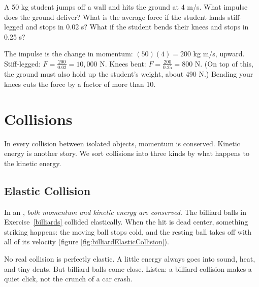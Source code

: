 \begin{Exercise}[title={Landing a jump}, label=impulse_jump]
A 50 kg student jumps off a wall and hits the ground at 4 m/s. What impulse
does the ground deliver? What is the average force if the student lands
stiff-legged and stops in 0.02 s? What if the student bends their knees and
stops in 0.25 s?
\end{Exercise}
\begin{Answer}[ref=impulse_jump]
The impulse is the change in momentum: $(50)(4) = 200$ kg m/s, upward.
Stiff-legged: $F = \frac{200}{0.02} = 10{,}000$ N. Knees bent:
$F = \frac{200}{0.25} = 800$ N. (On top of this, the ground must also hold
up the student's weight, about 490 N.) Bending your knees cuts the force by
a factor of more than 10.
\end{Answer}
\section{Collisions}
In every collision between isolated objects, momentum is conserved.
Kinetic energy is another story. We sort collisions into three kinds by
what happens to the kinetic energy.

\subsection{Elastic Collision}
In an , \emph{both
momentum and kinetic energy are conserved}. The billiard balls in
Exercise~\ref{billiards} collided elastically. When the hit is dead
center, something striking happens: the moving ball stops cold, and the
resting ball takes off with all of its velocity (figure
\ref{fig:billiardElasticCollision}).

No real collision is perfectly elastic. A little energy always goes into
sound, heat, and tiny dents. But billiard balls come close. Listen: a
billiard collision makes a quiet click, not the crunch of a car crash.

